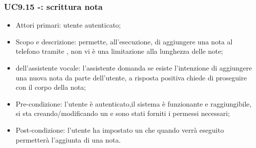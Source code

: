 \subsubsection{UC9.15 -: scrittura nota}
\begin{itemize}
	\item  Attori primari: utente autenticato;
	\item  Scopo e descrizione: permette, all'esecuzione, di aggiungere una nota al telefono tramite , non vi è una limitazione alla lunghezza delle note;
	\item  {} dell'assistente vocale: l'assistente domanda se esiste l'intenzione di aggiungere una nuova nota da parte dell'utente, a risposta positiva chiede di proseguire con il corpo della nota;
	\item  Pre-condizione: l'utente è autenticato,il sistema è funzionante e raggiungibile, si sta creando/modificando un  e sono stati forniti i permessi necessari;
	\item  Post-condizione: l'utente ha impostato un  che quando verrà eseguito permetterà l'aggiunta di una nota.
\end{itemize}

